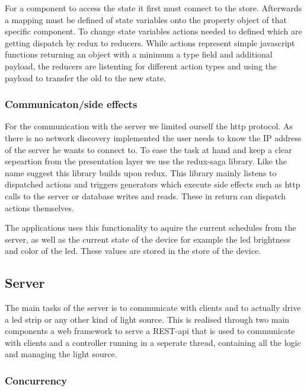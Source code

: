 \documentclass[conference]{IEEEtran}
\begin{document}
For a component to access the state it first must connect to the store. Afterwards a mapping must be defined of state variables onto the
property object of that specific component. To change state variables actions needed to defined which are getting dispatch by redux to
reducers. While actions represent simple javascript functions returning an object with a minimum a type field and additional payload,
the reducers are listenting for different action types and using the payload to transfer the old to the new state. 

\subsubsection{Communicaton/side effects}
For the communication with the server we limited ourself the http protocol. As there is no network discovery implemented the user needs
to know the IP address of the server he wants to connect to. To ease the task at hand and keep a clear sepeartion from the presentation
layer we use the redux-saga library. Like the name suggest this library builds upon redux. This library mainly listens to dispatched
actions and triggers generators which execute side effects such as http calls to the server or database writes and reads. These in
return can dispatch actions themselves.

The applications uses this functionality to aquire the current schedules from the server, as well as the current state of the device
for example the led brightness and color of the led. These values are stored in the store of the device.

\subsection{Server}
The main tasks of the server is to communicate with clients and to actually drive a led strip or any other kind of light source.
This is realised through two main components a web framework to serve a REST-api that is used to communicate with clients and a
controller running in a seperate thread, containing all the logic and managing the light source.

\subsubsection{Concurrency}
\end{document}
